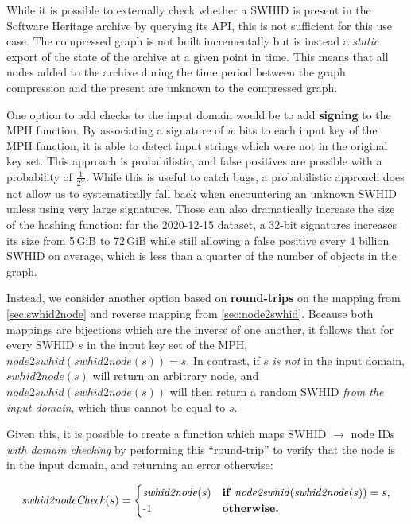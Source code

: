 While it is possible to externally check whether a \gls{SWHID} is present in
the Software Heritage archive by querying its API, this is not sufficient for
this use case. The compressed graph is not built incrementally but is instead a
\emph{static} export of the state of the archive at a given point in time. This
means that all nodes added to the archive during the time period between
the graph compression and the present are unknown to the compressed graph.

One option to add checks to the input domain would be to add \textbf{signing} to
the \gls{MPH} function. By associating a signature of $w$ bits to each input
key of the \gls{MPH} function, it is able to detect input strings which were
not in the original key set. This approach is probabilistic, and false
positives are possible with a probability of {\Large $\frac{1}{2^w}$}. While
this is useful to catch bugs, a probabilistic approach does not allow us to
systematically fall back when encountering an unknown \gls{SWHID} unless using
very large signatures. Those can also dramatically increase the size of the
hashing function: for the 2020-12-15 dataset, a 32-bit signatures increases its
size from 5\,GiB to 72\,GiB while still allowing a false positive every 4
billion \gls{SWHID} on average, which is less than a quarter of the number of
objects in the graph.

Instead, we consider another option based on \textbf{round-trips} on the
mapping from \cref{sec:swhid2node} and reverse mapping from
\cref{sec:node2swhid}.  Because both mappings are bijections which are
the inverse of one another, it follows that for every \gls{SWHID} $s$ in the
input key set of the \gls{MPH}, $\mathit{node2swhid}(\mathit{swhid2node}(s)) =
s$.  In contrast, if $s$ \emph{is not} in the input domain,
$\mathit{swhid2node}(s)$ will return an arbitrary node, and
$\mathit{node2swhid}(\mathit{swhid2node}(s))$ will then return a random
\gls{SWHID} \emph{from the input domain}, which thus cannot be equal to $s$.

Given this, it is possible to create a function which maps \gls{SWHID} $\to$
node IDs \emph{with domain checking} by performing this ``round-trip'' to
verify that the node is in the input domain, and returning an error otherwise:

\[
    \mathit{swhid2nodeCheck}(s) =
    \begin{cases}
        \mathit{swhid2node}(s) &
        \text{\textbf{if}}~\mathit{node2swhid}(\mathit{swhid2node}(s)) = s,\\
        \text{-1}            & \text{\textbf{otherwise.}}
    \end{cases}
\]

